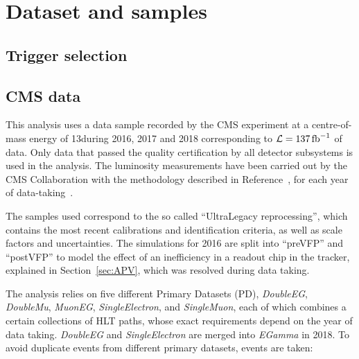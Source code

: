 \section{Dataset and samples}
\label{sec:datasets}

\subsection{Trigger selection}


\subsection{CMS data}
This analysis uses a data sample recorded by the CMS experiment at a centre-of-mass energy of 13\TeV during 2016, 2017 and 2018 corresponding to $\mathcal{L} = 137 \mbox{\ensuremath{\,\text{fb}^{-1}}}$ of data.
Only data that passed the quality certification by all detector subsystems is used in the analysis.
The luminosity measurements have been carried out by the CMS Collaboration
with the methodology described in Reference~\cite{CMS:LUM-17-003},
for each year of data-taking~\cite{CMS:LUM-17-004, CMS:LUM-18-002}.

The samples used correspond to the so called ``UltraLegacy reprocessing'',
which contains the most recent calibrations and identification criteria,
as well as scale factors and uncertainties.
The simulations for 2016 are split into ``preVFP'' and ``postVFP'' to model the effect
of an inefficiency in a readout chip in the tracker, explained in Section~\ref{sec:APV}, which was resolved during data taking.

The analysis relies on five different Primary Datasets (PD),
{\it DoubleEG}, {\it DoubleMu}, {\it MuonEG}, {\it SingleElectron}, and {\it SingleMuon},
each of which combines a certain collections of HLT paths, whose exact requirements depend on the year of data
taking. {\it DoubleEG} and {\it SingleElectron} are merged into {\it EGamma} in 2018.
To avoid duplicate events from different primary datasets, events are taken:

